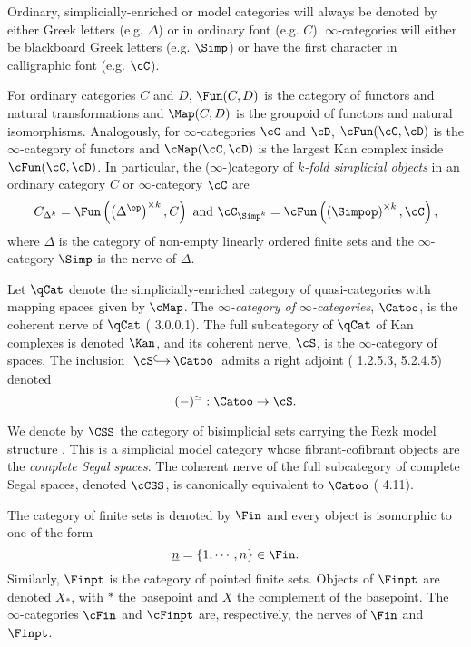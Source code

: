 \documentclass[a4paper]{article}
\numberwithin{equation}{section}
\begin{document}
 Ordinary, simplicially-enriched or model categories will always be denoted by either Greek letters (e.g. $\Delta$) or in ordinary font (e.g. $C$). %
 $\infty$-categories will either be blackboard Greek letters (e.g. $\Simp$) or have the first character in calligraphic font (e.g. $\cC$). 
 
 For ordinary categories $C$ and $D$, $\Fun(C,D)$ is the category of functors and natural transformations and $\Map(C,D)$ is the groupoid of functors and natural isomorphisms. Analogously, for $\infty$-categories $\cC$ and $\cD$, $\cFun(\cC,\cD)$ is the $\infty$-category of functors and $\cMap(\cC,\cD)$ is the largest Kan complex inside $\cFun(\cC,\cD)$. In particular, the ($\infty$-)category of {\em $k$-fold simplicial objects} in an ordinary category $C$ or $\infty$-category $\cC$ are 
 \begin{equation*}
  C_{\Delta^k} = \Fun\left(\left(\Delta^\op\right)^{\times k}, C\right) \ {\rm and} \ \cC_{\Simp^k} = \cFun\left(\left(\Simpop\right)^{\times k}, \cC\right),
 \end{equation*}
where $\Delta$ is the category of non-empty linearly ordered finite sets and the $\infty$-category $\Simp$ is the nerve of $\Delta$.
 
Let $\qCat$ denote the simplicially-enriched category of quasi-categories with mapping spaces given by $\cMap$. The {\em $\infty$-category of $\infty$-categories}, $\Catoo$, is the coherent nerve of $\qCat$ (\cite{HTT} 3.0.0.1). The full subcategory of $\qCat$ of Kan complexes is denoted $\Kan$, and its coherent nerve, $\cS$, is the $\infty$-category of spaces. The inclusion $\xymatrixcolsep{.8pc}\xymatrix{\cS \ar@{^{(}->}[r] &  \Catoo}$ admits a right adjoint (\cite{HTT} 1.2.5.3, 5.2.4.5) denoted
\begin{equation*}
 (-)^\simeq: \Catoo \to \cS.
\end{equation*}

We denote by $\CSS$ the category of bisimplicial sets carrying the Rezk model structure \cite{RezkCSS}. This is a simplicial model category whose fibrant-cofibrant objects are the {\em complete Segal spaces}. The coherent nerve of the full subcategory of complete Segal spaces, denoted $\cCSS$, is canonically equivalent to $\Catoo$ (\cite{JoyalTierney} 4.11).

The category of finite sets is denoted by $\Fin$ and every object is isomorphic to one of the form
 \begin{equation*}
 \underline{n}=\{1,\cdots, n\} \in \Fin.
 \end{equation*}
 Similarly, $\Finpt$ is the category of pointed finite sets. Objects of $\Finpt$ are denoted $X_*$, with $\ast$ the basepoint and $X$ the complement of the basepoint. The $\infty$-categories $\cFin$ and $\cFinpt$  are, respectively, the nerves of $\Fin$ and $\Finpt$.
 
\end{document}
